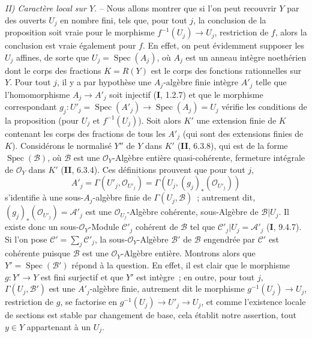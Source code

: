 \emph{II) Caractère local sur $Y$.} -- Nous allons montrer que si l'on peut
recouvrir $Y$ par des ouverts $U_j$ en nombre fini, tels que, pour tout $j$, la
conclusion de la proposition soit vraie pour le morphisme $f^{-1}(U_j)\to U_j$,
restriction de $f$, alors la conclusion est vraie également pour $f$. En effet, on
peut évidemment supposer les $U_j$ affines, de sorte que $U_j=\operatorname{Spec}(A_j)$, où
$A_j$ est un anneau intègre noethérien dont le corps des fractions $K=R(Y)$ est le
corps des fonctions rationnelles sur $Y$. Pour tout $j$, il y a par hypothèse une
$A_j$-algèbre finie intègre $A'_j$ telle que l'homomorphisme $A_j\to A'_j$ soit
injectif (\textbf{I}, 1.2.7) et que le morphisme correspondant
$g_j:U'_j=\operatorname{Spec}(A'_j)\to\operatorname{Spec}(A_j)=U_j$ vérifie les conditions de la proposition
(pour $U_j$ et $f^{-1}(U_j)$). Soit alors $K'$ une extension finie de $K$ contenant
les corps des fractions de tous les $A'_j$ (qui sont des extensions finies de $K$).
Considérons le normalisé $Y''$ de $Y$ dans $K'$ (\textbf{II}, 6.3.8), qui est de la
forme $\operatorname{Spec}(\mathcal B)$, où $\mathcal B$ est une $\mathcal O_Y$-Algèbre entière
quasi-cohérente, fermeture intégrale de $\mathcal O_Y$ dans $K'$ (\textbf{II},
6.3.4). Ces définitions prouvent que pour tout $j$,
\[
  A'_j=\Gamma(U'_j,\mathcal O_{U'_j})
      =\Gamma(U_j,(g_j)_*(\mathcal O_{U'_j}))
\]
s'identifie à une sous-$A_j$-algèbre finie de $\Gamma(U_j,\mathcal B)$~; autrement
dit, $(g_j)_*(\mathcal O_{U'_j})=\mathcal A'_j$ est une
$\mathcal O_{U_j}$-Algèbre cohérente, sous-Algèbre de $\mathcal B|U_j$. Il existe
donc un sous-$\mathcal O_Y$-Module $\mathcal C'_j$ cohérent de $\mathcal B$ tel que
$\mathcal C'_j|U_j=\mathcal A'_j$ (\textbf{I}, 9.4.7). Si l'on pose
$\mathcal C'=\sum_j\mathcal C'_j$, la sous-$\mathcal O_Y$-Algèbre $\mathcal B'$ de
$\mathcal B$ engendrée par $\mathcal C'$ est cohérente puisque $\mathcal B$ est une
$\mathcal O_Y$-Algèbre entière. Montrons alors que $Y'=\operatorname{Spec}(\mathcal B')$ répond à
la question. En effet, il est clair que le morphisme $g:Y'\to Y$ est fini surjectif
et que $Y'$ est intègre~; en outre, pour tout $j$, $\Gamma(U_j,\mathcal B')$ est une
$A'_j$-algèbre finie, autrement dit le morphisme $g^{-1}(U_j)\to U_j$, restriction
de $g$, se factorise en $g^{-1}(U_j)\to U'_j\to U_j$, et comme l'existence locale
de sections est stable par changement de base, cela établit notre assertion, tout
$y\in Y$ appartenant à un $U_j$.


